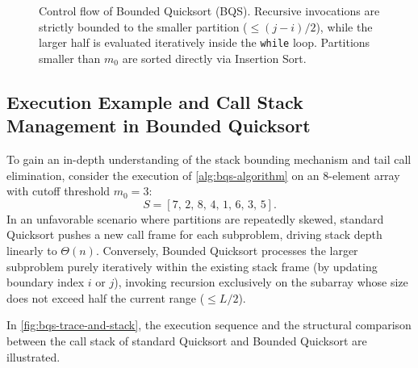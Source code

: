 \begin{figure}[H]
  \caption{Control flow of Bounded Quicksort (BQS). Recursive invocations are strictly bounded to the smaller partition ($\le (j-i)/2$), while the larger half is evaluated iteratively inside the \texttt{while} loop. Partitions smaller than $m_0$ are sorted directly via Insertion Sort.}
  \label{fig:bqs-control-flow}
\end{figure}

\FloatBarrier

\subsection{Execution Example and Call Stack Management in Bounded Quicksort}
\label{subsec:bqs-execution-example}

To gain an in-depth understanding of the stack bounding mechanism and tail call elimination, consider the execution of \autoref{alg:bqs-algorithm} on an 8-element array with cutoff threshold $m_0 = 3$:
\begin{equation}
  S = [7, \, 2, \, 8, \, 4, \, 1, \, 6, \, 3, \, 5].
\end{equation}
In an unfavorable scenario where partitions are repeatedly skewed, standard Quicksort pushes a new call frame for each subproblem, driving stack depth linearly to $\Theta(n)$. Conversely, Bounded Quicksort processes the larger subproblem purely iteratively within the existing stack frame (by updating boundary index $i$ or $j$), invoking recursion exclusively on the subarray whose size does not exceed half the current range ($\le L/2$).

In \autoref{fig:bqs-trace-and-stack}, the execution sequence and the structural comparison between the call stack of standard Quicksort and Bounded Quicksort are illustrated.

